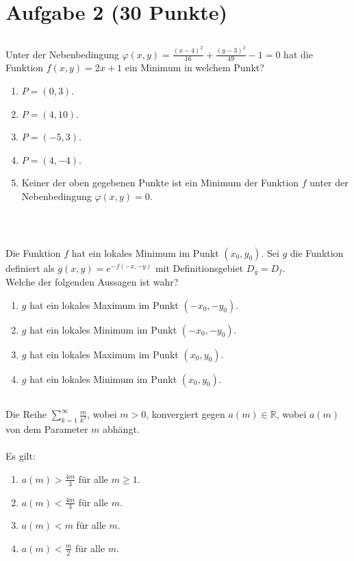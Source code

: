 \section*{Aufgabe 2 (30 Punkte)}
\vspace{0.4cm}
\subsection*{}
Unter der Nebenbedingung $ \varphi(x,y) = \frac{(x-4)^2}{16} + \frac{(y-3)^2}{49} -1 = 0 $ hat die Funktion $ f(x,y) = 2 x + 1  $ ein Minimum in welchem Punkt?
 \renewcommand{\labelenumi}{(\alph{enumi})}
\begin{enumerate}
\item $ P= (0,3) $.
\item $ P= (4,10) $.
\item $ P= (-5,3) $.
\item $ P= (4,-4) $.
\item Keiner der oben gegebenen Punkte ist ein Minimum der Funktion $ f $ unter der Nebenbedingung $ \varphi(x,y)= 0 $.
\end{enumerate}
\ \\
\subsection*{}
Die Funktion $ f $ hat ein lokales Minimum im Punkt $ (x_0,y_0) $.
Sei $ g $ die Funktion definiert als $ g(x,y) = e^{-f(-x,-y)} $ mit Definitionsgebiet $ D_g = D_f $.\\
Welche der folgenden Aussagen ist wahr?
\renewcommand{\labelenumi}{(\alph{enumi})}
\begin{enumerate}
\item $ g $ hat ein lokales Maximum im Punkt $ (-x_0,-y_0) $.
\item $ g $ hat ein lokales Minimum im Punkt $ (-x_0,-y_0) $.
\item $ g $ hat ein lokales Maximum im Punkt $ (x_0,y_0) $.
\item $ g $ hat ein lokales Minimum im Punkt $ (x_0,y_0) $.
\end{enumerate}
\newpage
\subsection*{}
Die Reihe $ \sum_{k=1}^\infty \frac{m}{k^4} $, wobei $ m > 0 $, konvergiert gegen $ a(m) \in \mathbb{R} $, wobei $ a(m) $ von dem Parameter $ m $ abhängt.\\
\\
Es gilt:
\renewcommand{\labelenumi}{(\alph{enumi})}
\begin{enumerate}
\item 
$ a(m) > \frac{4m}{3} $ für alle $ m \geq 1 $.
\item 
$ a(m) < \frac{4m}{3} $ für alle $ m  $.
\item 
$ a(m) < m $ für alle $ m  $.
\item
$ a(m) < \frac{m}{2} $ für alle $ m  $.
\end{enumerate}
\ \\
